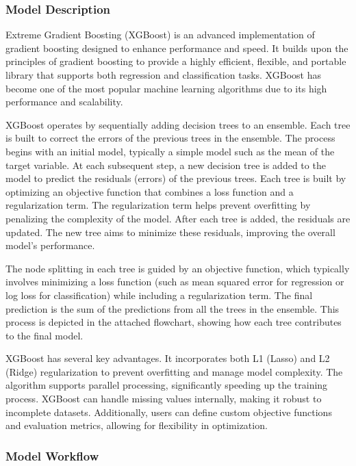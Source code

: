 \documentclass[
  letterpaper,
  DIV=11,
  numbers=noendperiod]{scrartcl}
\begin{document}
\subsubsection{Model Description}\label{model-description-4}

Extreme Gradient Boosting (XGBoost) is an advanced implementation of
gradient boosting designed to enhance performance and speed. It builds
upon the principles of gradient boosting to provide a highly efficient,
flexible, and portable library that supports both regression and
classification tasks. XGBoost has become one of the most popular machine
learning algorithms due to its high performance and scalability.

XGBoost operates by sequentially adding decision trees to an ensemble.
Each tree is built to correct the errors of the previous trees in the
ensemble. The process begins with an initial model, typically a simple
model such as the mean of the target variable. At each subsequent step,
a new decision tree is added to the model to predict the residuals
(errors) of the previous trees. Each tree is built by optimizing an
objective function that combines a loss function and a regularization
term. The regularization term helps prevent overfitting by penalizing
the complexity of the model. After each tree is added, the residuals are
updated. The new tree aims to minimize these residuals, improving the
overall model's performance.

The node splitting in each tree is guided by an objective function,
which typically involves minimizing a loss function (such as mean
squared error for regression or log loss for classification) while
including a regularization term. The final prediction is the sum of the
predictions from all the trees in the ensemble. This process is depicted
in the attached flowchart, showing how each tree contributes to the
final model.

XGBoost has several key advantages. It incorporates both L1 (Lasso) and
L2 (Ridge) regularization to prevent overfitting and manage model
complexity. The algorithm supports parallel processing, significantly
speeding up the training process. XGBoost can handle missing values
internally, making it robust to incomplete datasets. Additionally, users
can define custom objective functions and evaluation metrics, allowing
for flexibility in optimization.

\subsubsection{Model Workflow}\label{model-workflow-4}
\end{document}
